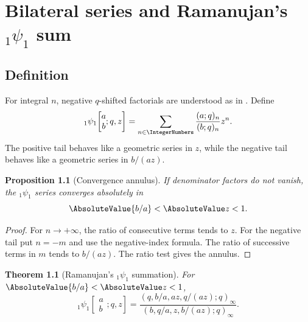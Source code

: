 \documentclass[11pt,a4paper,oneside,openany]{book}
\newtheorem{theorem}{Theorem}[chapter]
\newtheorem{proposition}[proposition]{Proposition}
\theoremstyle{definition}
\theoremstyle{remark}
\begin{document}
\chapter{Bilateral series and Ramanujan's \texorpdfstring{${}_1\psi_1$}{1psi1} sum}\label{chap:bilateral}

\section{Definition}

For integral $n$, negative $q$-shifted factorials are understood as in .  Define
\[
 {}_1\psi_1\!\left[\begin{matrix}a\\b\end{matrix};q,z\right]
 =\sum_{n\in\IntegerNumbers}\frac{(a;q)_n}{(b;q)_n}z^n.
\]
The positive tail behaves like a geometric series in $z$, while the negative tail behaves like a geometric series in $b/(az)$.

\begin{proposition}[Convergence annulus]\label{prop:1psi1-convergence}
If denominator factors do not vanish, the ${}_1\psi_1$ series converges absolutely in
\[
 \AbsoluteValue{b/a}<\AbsoluteValue z<1.
\]
\end{proposition}

\begin{proof}
For $n\to+\infty$, the ratio of consecutive terms tends to $z$.  For the negative tail put $n=-m$ and use the negative-index formula.  The ratio of successive terms in $m$ tends to $b/(az)$.  The ratio test gives the annulus.
\end{proof}

\begin{theorem}[Ramanujan's ${}_1\psi_1$ summation]\label{thm:1psi1}
For $\AbsoluteValue{b/a}<\AbsoluteValue z<1$,
\[
 {}_1\psi_1\!\left[\begin{matrix}a\\b\end{matrix};q,z\right]
 =\frac{(q,b/a,az,q/(az);q)_\infty}
 {(b,q/a,z,b/(az);q)_\infty}.
\]
\end{theorem}
\end{document}
